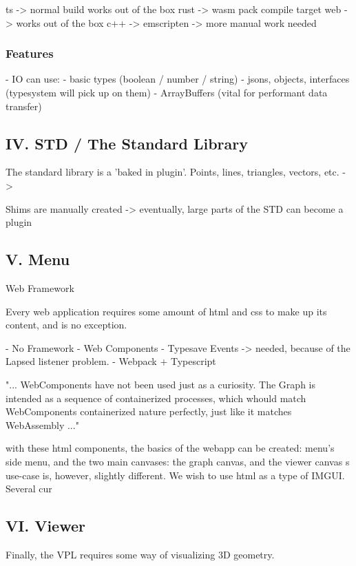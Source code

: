 ts -> normal build works out of the box
rust -> wasm pack compile target web -> works out of the box 
c++ -> emscripten -> more manual work needed 

\subsubsection{Features}
- IO can use:
  - basic types (boolean / number / string)
  - jsons, objects, interfaces (typesystem will pick up on them)
  - ArrayBuffers (vital for performant data transfer)




\subsection{IV. STD / The Standard Library}

The standard library is a 'baked in plugin'.
Points, lines, triangles, vectors, etc.
-> 

Shims are manually created
-> eventually, large parts of the STD can become a plugin




\subsection{V. Menu}
Web Framework

Every web application requires some amount of html and css to make up its content, and \geofront{} is no exception. 


- No Framework
- Web Components
- Typesave Events -> needed, because of the Lapsed listener problem.
- Webpack + Typescript

"...
WebComponents have not been used just as a curiosity. 
The Graph is intended as a sequence of containerized processes, 
which whould match WebComponents containerized nature perfectly, just like it matches WebAssembly
..."

with these html components, the basics of the webapp can be created: menu's side menu, and the two main canvases: the graph canvas, and the viewer canvas 
\geofront{}s use-case is, however, slightly different. We wish to use html as a type of IMGUI. Several cur




\subsection{VI. Viewer}
Finally, the VPL requires some way of visualizing 3D geometry. 
 
